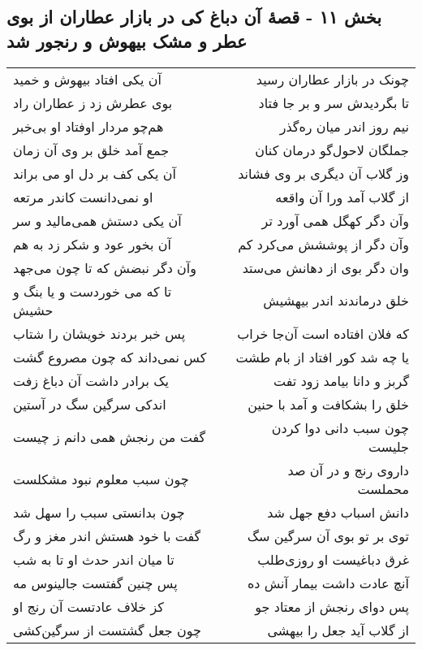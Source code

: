 \begin{center}
\section*{بخش ۱۱ - قصهٔ آن دباغ کی در بازار عطاران از بوی عطر و مشک بیهوش و رنجور شد}
\label{sec:sh011}
\begin{longtable}{l p{0.5cm} r}
آن یکی افتاد بیهوش و خمید
&&
چونک در بازار عطاران رسید
\\
بوی عطرش زد ز عطاران راد
&&
تا بگردیدش سر و بر جا فتاد
\\
هم‌چو مردار اوفتاد او بی‌خبر
&&
نیم روز اندر میان ره‌گذر
\\
جمع آمد خلق بر وی آن زمان
&&
جملگان لاحول‌گو درمان کنان
\\
آن یکی کف بر دل او می براند
&&
وز گلاب آن دیگری بر وی فشاند
\\
او نمی‌دانست کاندر مرتعه
&&
از گلاب آمد ورا آن واقعه
\\
آن یکی دستش همی‌مالید و سر
&&
وآن دگر کهگل همی آورد تر
\\
آن بخور عود و شکر زد به هم
&&
وآن دگر از پوششش می‌کرد کم
\\
وآن دگر نبضش که تا چون می‌جهد
&&
وان دگر بوی از دهانش می‌ستد
\\
تا که می خوردست و یا بنگ و حشیش
&&
خلق درماندند اندر بیهشیش
\\
پس خبر بردند خویشان را شتاب
&&
که فلان افتاده است آن‌جا خراب
\\
کس نمی‌داند که چون مصروع گشت
&&
یا چه شد کور افتاد از بام طشت
\\
یک برادر داشت آن دباغ زفت
&&
گربز و دانا بیامد زود تفت
\\
اندکی سرگین سگ در آستین
&&
خلق را بشکافت و آمد با حنین
\\
گفت من رنجش همی دانم ز چیست
&&
چون سبب دانی دوا کردن جلیست
\\
چون سبب معلوم نبود مشکلست
&&
داروی رنج و در آن صد محملست
\\
چون بدانستی سبب را سهل شد
&&
دانش اسباب دفع جهل شد
\\
گفت با خود هستش اندر مغز و رگ
&&
توی بر تو بوی آن سرگین سگ
\\
تا میان اندر حدث او تا به شب
&&
غرق دباغیست او روزی‌طلب
\\
پس چنین گفتست جالینوس مه
&&
آنچ عادت داشت بیمار آنش ده
\\
کز خلاف عادتست آن رنج او
&&
پس دوای رنجش از معتاد جو
\\
چون جعل گشتست از سرگین‌کشی
&&
از گلاب آید جعل را بیهشی
\\

\end{longtable}
\end{center}
